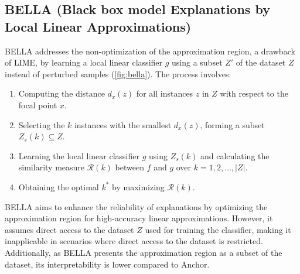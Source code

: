 \documentclass[runningheads]{llncs}
\begin{document}
\subsection{%
	BELLA (Black box model Explanations by Local Linear Approximations)
	\cite{radulovic2023bella}
}
BELLA addresses the non-optimization of the approximation region,
a drawback of LIME,
by learning a local linear classifier $g$
using a subset $Z'$ of the dataset $Z$
instead of perturbed samples (\cref{fig:bella}).
The process involves:
\begin{enumerate}
	\item Computing the distance $d_x(z)$ for all instances $z$ in $Z$
	      with respect to the focal point $x$.
	\item Selecting the $k$ instances with the smallest $d_x(z)$,
	      forming a subset $Z_s(k) \subseteq Z$.
	\item Learning the local linear classifier $g$ using $Z_s(k)$
	      and calculating the similarity measure $\mathcal{R}(k)$ between $f$ and $g$
	      over $k=1,2,\dots,|Z|$.
	\item Obtaining the optimal $k^*$ by maximizing $\mathcal{R}(k)$.
\end{enumerate}

BELLA aims to enhance the reliability of explanations
by optimizing the approximation region for high-accuracy linear approximations.
However, it assumes direct access to the dataset $Z$ used for training the classifier,
making it inapplicable in scenarios where direct access to the dataset is restricted.
Additionally,
as BELLA presents the approximation region as a subset of the dataset,
its interpretability is lower compared to Anchor.
\end{document}
